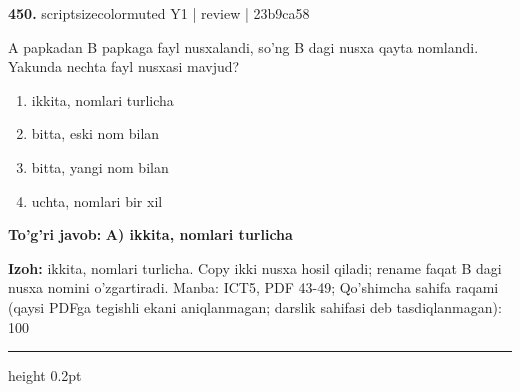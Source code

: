 \documentclass[10pt,a4paper]{article}
\begin{document}
{\bfseries\sffamily\color{ink} 450.} {scriptsizecolor{muted} Y1 | review | 23b9ca58}
\par
A papkadan B papkaga fayl nusxalandi, so'ng B dagi nusxa qayta nomlandi. Yakunda nechta fayl nusxasi mavjud?
\begin{enumerate}[label=\Alph*),leftmargin=9mm]
\item ikkita, nomlari turlicha
\item bitta, eski nom bilan
\item bitta, yangi nom bilan
\item uchta, nomlari bir xil
\end{enumerate}
\begin{tcolorbox}[enhanced,breakable,colback=teal!4,colframe=teal!60!black,boxrule=0.45pt,arc=1.2mm,left=2.7mm,right=2.7mm,top=1.8mm,bottom=1.8mm,before skip=2mm,after skip=2mm]
{\bfseries\sffamily\color{teal}To'g'ri javob:} \textbf{A) ikkita, nomlari turlicha}
\par\smallskip
{\bfseries Izoh:} ikkita, nomlari turlicha. Copy ikki nusxa hosil qiladi; rename faqat B dagi nusxa nomini o'zgartiradi. Manba: ICT5, PDF 43-49; Qo'shimcha sahifa raqami (qaysi PDFga tegishli ekani aniqlanmagan; darslik sahifasi deb tasdiqlanmagan): 100
\end{tcolorbox}
\vspace{2mm}\hrule height 0.2pt\vspace{3mm}
\end{document}
